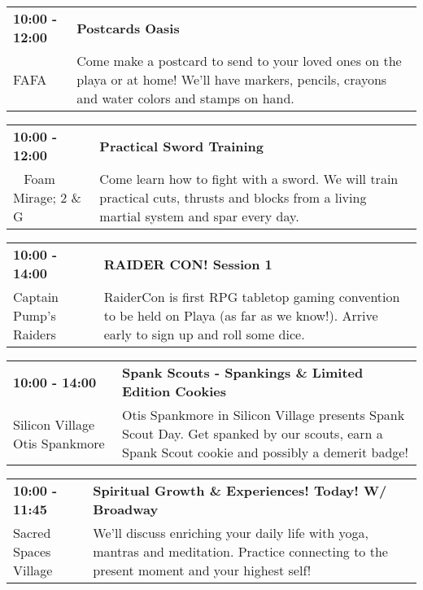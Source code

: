 \begin{tabular}{ p{1in} p{2.2in} }
    \textbf{10:00 - 12:00} & \textbf{Postcards Oasis} \\
    FAFA \newline  & Come make a postcard to send to your loved ones on the playa or at home! We'll have markers, pencils, crayons and water colors and stamps on hand. \\
    \hline 
\end{tabular}
    
\begin{tabular}{ p{1in} p{2.2in} }
    \textbf{10:00 - 12:00} & \textbf{Practical Sword Training} \\
    ~ \newline Foam Mirage; 2 \& G & Come learn how to fight with a sword. We will train practical cuts, thrusts and blocks from a living martial system and spar every day. \\
    \hline 
\end{tabular}
    
\begin{tabular}{ p{1in} p{2.2in} }
    \textbf{10:00 - 14:00} & \textbf{RAIDER CON! Session 1} \\
    Captain Pump's Raiders \newline  & RaiderCon is first RPG tabletop gaming convention to be held on Playa (as far as we know!). Arrive early to sign up and roll some dice. \\
    \hline 
\end{tabular}
    
\begin{tabular}{ p{1in} p{2.2in} }
    \textbf{10:00 - 14:00} & \textbf{Spank Scouts - Spankings \& Limited Edition Cookies} \\
    Silicon Village \newline Otis Spankmore & Otis Spankmore in Silicon Village presents Spank Scout Day. Get spanked by our scouts, earn a Spank Scout cookie and possibly a demerit badge! \\
    \hline 
\end{tabular}
    
\begin{tabular}{ p{1in} p{2.2in} }
    \textbf{10:00 - 11:45} & \textbf{Spiritual Growth \& Experiences! Today! W/ Broadway} \\
    Sacred Spaces Village \newline  & We'll discuss enriching your daily life with yoga, mantras and meditation. Practice connecting to the present moment and your highest self! \\
    \hline 
\end{tabular}
    
